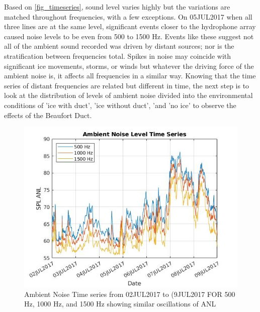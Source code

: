 Based on \autoref{fig_timeseries}, sound level varies highly but the variations are matched throughout frequencies, with a few exceptions. On 05JUL2017 when all three lines are at the same level, significant events closer to the hydrophone array caused noise levels to be even from 500 to 1500 Hz. Events like these suggest not all of the ambient sound recorded was driven by distant sources; nor is the stratification between frequencies total. Spikes in noise may coincide with significant ice movements, storms, or winds but whatever the driving force of the ambient noise is, it affects all frequencies in a similar way. Knowing that the time series of distant frequencies are related but different in time, the next step is to look at the distribution of levels of ambient noise divided into the environmental conditions of 'ice with duct', 'ice without duct', 'and 'no ice' to observe the effects of the Beaufort Duct.


\begin{figure}[ht]
\centering
\includegraphics[scale=0.6]{Figures/timeseries_500_1500_july_overlay.jpg}
\caption{Ambient Noise Time series from 02JUL2017 to (9JUL2017 FOR 500 Hz, 1000 Hz, and 1500 Hz showing similar oscillations of ANL}
\label{fig_timeseries}
\end{figure}





